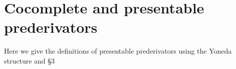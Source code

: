 \section{Cocomplete and presentable prederivators}
Here we give the definitions of presentable prederivators using the Yoneda structure and §3
